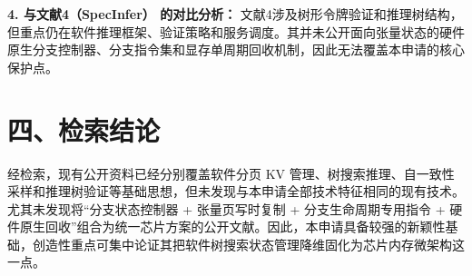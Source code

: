 \documentclass[12pt,a4paper]{article}
\begin{document}
\textbf{4. 与文献4（SpecInfer） 的对比分析：}
文献4涉及树形令牌验证和推理树结构，但重点仍在软件推理框架、验证策略和服务调度。其并未公开面向张量状态的硬件原生分支控制器、分支指令集和显存单周期回收机制，因此无法覆盖本申请的核心保护点。

\section*{四、检索结论}

经检索，现有公开资料已经分别覆盖软件分页 KV 管理、树搜索推理、自一致性采样和推理树验证等基础思想，但未发现与本申请全部技术特征相同的现有技术。尤其未发现将“分支状态控制器 + 张量页写时复制 + 分支生命周期专用指令 + 硬件原生回收”组合为统一芯片方案的公开文献。因此，本申请具备较强的新颖性基础，创造性重点可集中论证其把软件树搜索状态管理降维固化为芯片内存微架构这一点。
\end{document}
